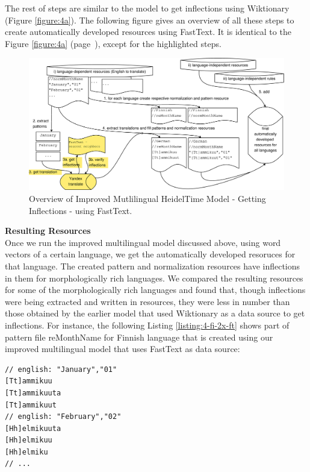 The rest of steps are similar to the model to get inflections using Wiktionary (Figure \ref{figure:4a}). The following figure gives an overview of all these steps to create automatically developed resources using FastText. It is identical to the Figure \ref{figure:4a} (page~\pageref{figure:4a}), except for the highlighted steps. 

\begin{figure}[H] 
	\centering
	\includegraphics[width=14cm]{Graphics/ht-multilingual-new-2}
	\caption{Overview of Improved Mutlilingual HeidelTime Model - Getting Inflections - using FastText.}
	\label{figure:4c}
\end{figure}

\textbf{Resulting Resources}\\
Once we run the improved multilingual model discussed above, using word vectors of a certain language, we get the automatically developed resoruces for that language. The created pattern and normalization resources have inflections in them for morphologically rich languages. We compared the resulting resources for some of the morphologically rich languages and found that, though inflections were being extracted and written in resources, they were less in number than those obtained by the earlier model that used Wiktionary as a data source to get inflections. For instance, the following Listing \ref{listing:4-fi-2x-ft} shows part of pattern file reMonthName for Finnish language that is created using our improved multilingual model that uses FastText as data source:\\

\begin{minipage}{\linewidth}
\begin{lstlisting}[caption={reMonthName for Finnish language - using Improved Multilingual HeidelTime Model - using FastText.},label={listing:4-fi-2x-ft}]
// english: "January","01"
[Tt]ammikuu
[Tt]ammikuuta
[Tt]ammikuut
// english: "February","02"
[Hh]elmikuuta
[Hh]elmikuu
[Hh]elmiku
// ...
\end{lstlisting}
\end{minipage}

